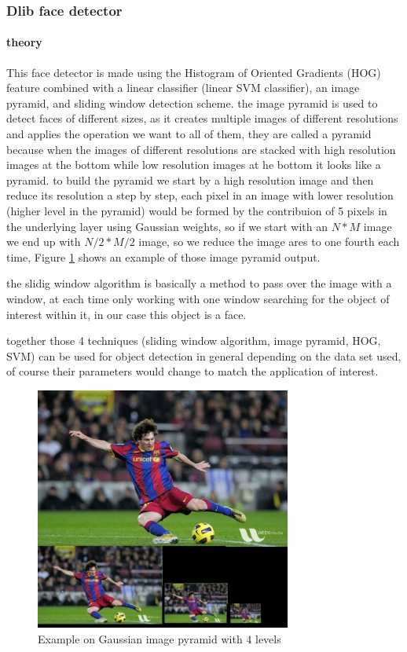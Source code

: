 
\subsubsection{Dlib face detector}
\paragraph{theory}
This face detector is made using the Histogram of Oriented Gradients (HOG) feature combined with a linear classifier (linear SVM classifier), an image pyramid, and sliding window detection scheme.
the image pyramid is used to detect faces of different sizes, as it creates multiple images of different resolutions and applies the operation we want to all of them, they are called a pyramid because when the images of different resolutions are stacked with high resolution images at the bottom while low resolution images at he bottom it looks like a pyramid.
to build the pyramid we start by a high resolution image and then reduce its resolution a step by step, each pixel in an image with lower resolution (higher level in the pyramid) would be formed by the contribuion of 5 pixels in the underlying layer using Gaussian weights, so if we start with an $N * M$ image we end up with $N/2 * M/2$ image, so we reduce the image ares to one fourth each time, Figure \ref{fig:gaussian_pyramid} shows an example of those image pyramid output.

the slidig window algorithm is basically a method to pass over the image with a window, at each time only working with one window searching for the object of interest within it, in our case this object is a face.

together those 4 techniques (sliding window algorithm, image pyramid, HOG, SVM) can be used for object detection in general depending on the data set used, of course their parameters would change to match the application of interest.

\begin{figure}
	\centering
	\includegraphics[width=0.75\textwidth]{images/gaussian_pyramid.jpg}
	\caption{Example on Gaussian image pyramid with 4 levels}
	\label{fig:gaussian_pyramid}
\end{figure}

